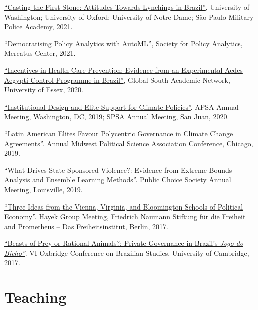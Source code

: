 \documentclass[a4paper]{article}
\renewenvironment{itemize}{
	\begin{list}{}{
			\setlength{\leftmargin}{1.5em}
		}
		}{
	\end{list}
}
\begin{document}
\begin{itemize}
\item \href{https://github.com/danilofreire/lynching-experiment-brazil}{``Casting the First Stone: Attitudes Towards Lynchings in Brazil''}, University of Washington; University of Oxford; University of Notre Dame; São Paulo Military Police Academy, 2021.
\item \href{https://github.com/danilofreire/mercatus-analytics-papers}{``Democratising Policy Analytics with AutoML''}, Society for Policy Analytics, Mercatus Center, 2021.
\item \href{https://danilofreire.github.io/essex2020/aedes.html}{``Incentives in Health Care Prevention: Evidence from an Experimental Aedes Aegypti Control Programme in Brazil''}, Global South Academic Network, University of Essex, 2020.
\item \href{https://osf.io/9a6ch}{``Institutional Design and Elite Support for Climate Policies''}. APSA Annual Meeting, Washington, DC, 2019; SPSA Annual Meeting, San Juan, 2020.
\item \href{https://osf.io/9a6ch}{``Latin American Elites Favour Polycentric Governance in Climate Change Agreements''}. Annual Midwest Political Science Association Conference, Chicago, 2019.
\item ``What Drives State-Sponsored Violence?: Evidence from Extreme Bounds Analysis and Ensemble Learning Methods''. Public Choice Society Annual Meeting, Louisville, 2019.
\item \href{https://www.overleaf.com/project/591ef5259fb58ede3dc4d369}{``Three Ideas from the Vienna, Virginia, and Bloomington Schools of Political Economy''}. Hayek Group Meeting, Friedrich Naumann Stiftung f{\"u}r die Freiheit and Prometheus -- Das Freiheitsinstitut, Berlin, 2017.
\item \href{https://osf.io/se2jr}{``Beasts of Prey or Rational Animals?: Private Governance in Brazil's \emph{Jogo do Bicho''}}. VI Oxbridge Conference on Brazilian Studies, University of Cambridge, 2017.
\end{itemize}

\section*{Teaching}
\end{document}
